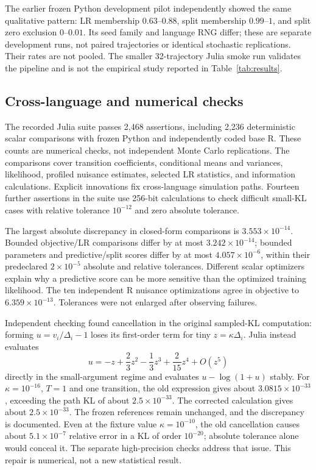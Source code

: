 \documentclass[11pt]{article}
\begin{document}
The earlier frozen Python development pilot independently showed the same
qualitative pattern: LR membership $0.63$--$0.88$, split membership $0.99$--$1$,
and split zero exclusion $0$--$0.01$. Its seed family and language RNG differ;
these are separate development runs, not paired trajectories or identical
stochastic replications. Their rates are not pooled. The smaller 32-trajectory
Julia smoke run validates the pipeline and is not the empirical study reported
in Table~\ref{tab:results}.

\subsection{Cross-language and numerical checks}
The recorded Julia suite passes 2,468 assertions, including 2,236 deterministic
scalar comparisons with frozen Python and independently coded base R. These
counts are numerical checks, not independent Monte Carlo replications. The
comparisons cover transition coefficients, conditional means and variances,
likelihood, profiled nuisance estimates, selected LR statistics, and information
calculations. Explicit innovations fix cross-language simulation paths.
Fourteen further assertions in the suite use 256-bit calculations to check
difficult small-KL cases with
relative tolerance $10^{-12}$ and zero absolute tolerance.

The largest absolute discrepancy in closed-form comparisons is
$3.553\times10^{-14}$. Bounded objective/LR comparisons differ by at most
$3.242\times10^{-14}$; bounded parameters and predictive/split scores differ by
at most $4.057\times10^{-6}$, within their predeclared $2\times10^{-5}$ absolute
and relative tolerances. Different scalar optimizers explain why a predictive
score can be more sensitive than the optimized training likelihood. The ten
independent R nuisance optimizations agree in objective to
$6.359\times10^{-13}$. Tolerances were not enlarged after observing failures.

Independent checking found cancellation in the original sampled-KL computation:
forming $u=v_i/\Delta_i-1$ loses its first-order term for tiny
$z=\kappa\Delta_i$. Julia instead evaluates
\[
 u=-z+\frac23z^2-\frac13z^3+\frac{2}{15}z^4+O(z^5)
\]
directly in the small-argument regime and evaluates $u-\log(1+u)$ stably.
For $\kappa=10^{-16}$, $T=1$ and one transition, the old expression gives about
$3.0815\times10^{-33}$, exceeding the path KL of about $2.5\times10^{-33}$.
The corrected calculation gives about $2.5\times10^{-33}$. The frozen references
remain unchanged, and the discrepancy is documented. Even at the fixture value
$\kappa=10^{-10}$, the old cancellation causes about $5.1\times10^{-7}$ relative
error in a KL of order $10^{-20}$; absolute tolerance alone would conceal it.
The separate high-precision checks address that issue. This repair is numerical,
not a new statistical result.
\end{document}
